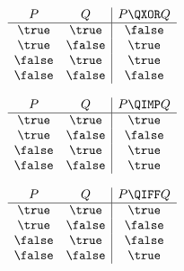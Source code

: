 \documentclass[handout]{mcs}
\begin{document}
\[
\begin{array}{cc|c}
P & Q & P \QXOR Q \\ \hline
\true & \true & \false \\
\true & \false & \true \\
\false & \true & \true \\
\false & \false & \false
\end{array}
\]

\[
\begin{array}{cc|c}
    P  &   Q    & P \QIMP Q \\ \hline
\true  & \true  & \true \\
\true  & \false & \false \\
\false & \true  & \true \\
\false & \false & \true  
\end{array}
\]

\[
\begin{array}{cc|c}
P & Q & P \QIFF Q \\ \hline
\true & \true & \true \\
\true & \false & \false \\
\false & \true & \false \\
\false & \false & \true
\end{array}
\]

\iffalse
\begin{figure}[htbp]
\texttt{[image: add1-circuit-diagram.pdf]}
\caption{Structure of a Double-size Add1 Module.}
\label{fig:add1}
\end{figure}
\fi

\end{document}
